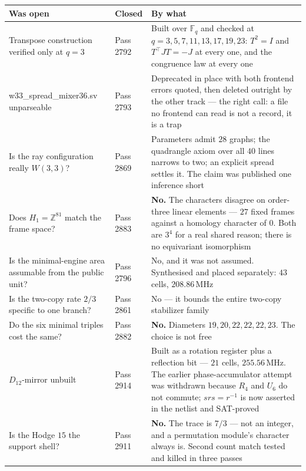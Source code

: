 \documentclass[11pt,a4paper]{article}
\newcommand{\cmd}[1]{{\ttfamily #1}}
\begin{document}
{\footnotesize
\begin{center}
\begin{tabular}{@{}p{5.7cm}p{1.4cm}p{7.0cm}@{}}
\toprule
\textbf{Was open} & \textbf{Closed} & \textbf{By what}\\
\midrule
Transpose construction verified only at $q=3$ & Pass 2792 &
  Built over $\mathbb{F}_q$ and checked at $q=3,5,7,11,13,17,19,23$: $T^2=I$ and
  $T^\top JT=-J$ at every one, and the congruence law at every one \\
\cmd{w33\_spread\_mixer36.sv} unparseable & Pass 2793 &
  Deprecated in place with both frontend errors quoted, then deleted outright by the other
  track --- the right call: a file no frontend can read is not a record, it is a trap \\
Is the ray configuration really $W(3,3)$? & Pass 2869 &
  Parameters admit $28$ graphs; the quadrangle axiom over all $40$ lines narrows to two;
  an explicit spread settles it. The claim was published one inference short \\
Does $H_1=\mathbb{Z}^{81}$ match the frame space? & Pass 2883 &
  \textbf{No.} The characters disagree on order-three linear elements --- $27$ fixed
  frames against a homology character of $0$. Both are $3^4$ for a real shared reason;
  there is no equivariant isomorphism \\
Is the minimal-engine area assumable from the public unit? & Pass 2796 &
  No, and it was not assumed. Synthesised and placed separately: $43$ cells, $208.86$\,MHz \\
Is the two-copy rate $2/3$ specific to one branch? & Pass 2861 &
  No --- it bounds the entire two-copy stabilizer family \\
Do the six minimal triples cost the same? & Pass 2882 &
  \textbf{No.} Diameters $19,20,22,22,22,23$. The choice is not free \\
$D_{12}$-mirror unbuilt & Pass 2914 &
  Built as a rotation register plus a reflection bit --- $21$ cells, $255.56$\,MHz.
  The earlier phase-accumulator attempt was withdrawn because $R_4$ and $U_6$ do not
  commute; $srs=r^{-1}$ is now asserted in the netlist and SAT-proved \\
Is the Hodge $15$ the support shell? & Pass 2911 &
  \textbf{No.} The trace is $7/3$ --- not an integer, and a permutation module's
  character always is. Second count match tested and killed in three passes \\
\bottomrule
\end{tabular}
\end{center}}
\end{document}
